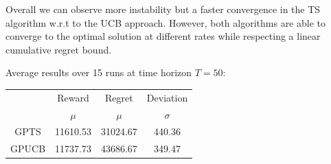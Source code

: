 Overall we can observe more instability but a faster convergence in the TS algorithm w.r.t to the UCB approach.
However, both algorithms are able to converge to the optimal solution at different rates while respecting a linear cumulative regret bound.

Average results over 15 runs at time horizon $T = 50$:

\begin{table}[h]
	\center
	\begin{tabular}{|c|cc|c|}
	\hline \hline
		\cellcolor{blue!25} & Reward 	& Regret	& Deviation \\
	\cline{2-4}
		\cellcolor{blue!25} & $\mu$		& $\mu$		& $\sigma$	\\
	\hline \hline
		GPTS 				& 11610.53 	& 31024.67	& 440.36 	\\
	\hline
		GPUCB				& 11737.73	& 43686.67	& 349.47	\\
	\hline \hline
	\end{tabular}
\end{table}
